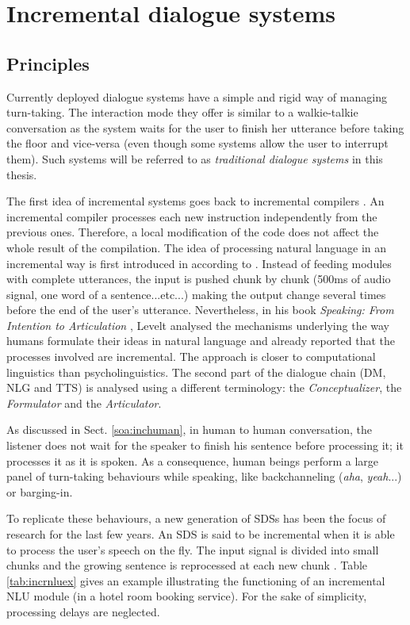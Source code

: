 \section{Incremental dialogue systems}
	
	\subsection{Principles}
	
		Currently deployed dialogue systems have a simple and rigid way of managing turn-taking. The interaction mode they offer is similar to a walkie-talkie conversation as the system waits for the user to finish her utterance before taking the floor and vice-versa (even though some systems allow the user to interrupt them). Such systems will be referred to as \textit{traditional dialogue systems} in this thesis.
    
		The first idea of incremental systems goes back to incremental compilers \cite{Lock1965}. An incremental compiler processes each new instruction independently from the previous ones. Therefore, a local modification of the code does not affect the whole result of the compilation. The idea of processing natural language in an incremental way is first introduced in \cite{Wiren1992} according to \cite{Kilger1995}. Instead of feeding modules with complete utterances, the input is pushed chunk by chunk (500ms of audio signal, one word of a sentence...etc...) making the output change several times before the end of the user's utterance. Nevertheless, in his book \textit{Speaking: From Intention to Articulation} \cite{Levelt1989}, Levelt analysed the mechanisms underlying the way humans formulate their ideas in natural language and already reported that the processes involved are incremental. The approach is closer to computational linguistics than psycholinguistics. The second part of the dialogue chain (DM, NLG and TTS) is analysed using a different terminology: the \textit{Conceptualizer}, the \textit{Formulator} and the \textit{Articulator}.

		As discussed in Sect. \ref{soa:inchuman}, in human to human conversation, the listener does not wait for the speaker to finish his sentence before processing it; it processes it as it is spoken. As a consequence, human beings perform a large panel of turn-taking behaviours while speaking, like backchanneling (\textit{aha}, \textit{yeah}...) or barging-in.
	
		To replicate these behaviours, a new generation of SDSs has been the focus of research for the last few years. An SDS is said to be incremental when it is able to process the user's speech on the fly. The input signal is divided into small chunks and the growing sentence is reprocessed at each new chunk \cite{Schlangen2011}. Table \ref{tab:incrnluex} gives an example illustrating the functioning of an incremental NLU module (in a hotel room booking service). For the sake of simplicity, processing delays are neglected.
	
